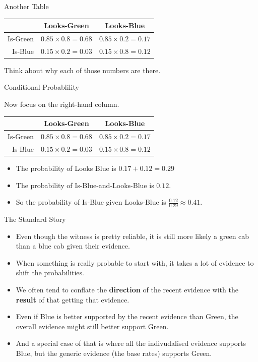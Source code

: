 \documentclass[
  ignorenonframetext,
]{beamer}
\providecommand{\tightlist}{%
  \setlength{\itemsep}{0pt}\setlength{\parskip}{0pt}}
\renewcommand{\,}{\text{, }}
\begin{document}
\begin{frame}{Another Table}
\protect\hypertarget{another-table}{}

\begin{longtable}[]{@{}rcc@{}}
\toprule
& Looks-Green & Looks-Blue\tabularnewline
\midrule
\endhead
Is-Green & \(0.85 \times 0.8 = 0.68\) &
\(0.85 \times 0.2 = 0.17\)\tabularnewline
Is-Blue & \(0.15 \times 0.2 = 0.03\) &
\(0.15 \times 0.8 = 0.12\)\tabularnewline
\bottomrule
\end{longtable}

Think about why each of those numbers are there.

\end{frame}

\begin{frame}{Conditional Probablility}
\protect\hypertarget{conditional-probablility}{}

Now focus on the right-hand column.

\begin{longtable}[]{@{}rcc@{}}
\toprule
& Looks-Green & Looks-Blue\tabularnewline
\midrule
\endhead
Is-Green & \(0.85 \times 0.8 = 0.68\) &
\(0.85 \times 0.2 = 0.17\)\tabularnewline
Is-Blue & \(0.15 \times 0.2 = 0.03\) &
\(0.15 \times 0.8 = 0.12\)\tabularnewline
\bottomrule
\end{longtable}

\pause

\begin{itemize}
\tightlist
\item
  The probability of Looks Blue is \(0.17 + 0.12 = 0.29\) \pause
\item
  The probability of Is-Blue-and-Looks-Blue is \(0.12\). \pause
\item
  So the probability of Is-Blue given Looks-Blue is
  \(\frac{0.12}{0.29} \approx 0.41\).
\end{itemize}

\end{frame}

\begin{frame}{The Standard Story}
\protect\hypertarget{the-standard-story}{}

\begin{itemize}[<+->]
\tightlist
\item
  Even though the witness is pretty reliable, it is still more likely a
  green cab than a blue cab given their evidence.
\item
  When something is really probable to start with, it takes a lot of
  evidence to shift the probabilities.
\item
  We often tend to conflate the \textbf{direction} of the recent
  evidence with the \textbf{result} of that getting that evidence.
\item
  Even if Blue is better supported by the recent evidence than Green,
  the overall evidence might still better support Green.
\item
  And a special case of that is where all the indivudalised evidence
  supports Blue, but the generic evidence (the base rates) supports
  Green.
\end{itemize}

\end{frame}
\end{document}
